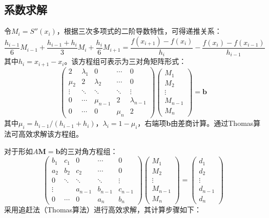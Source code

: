 \subsection{系数求解}
令$M_i = S''(x_i)$，根据三次多项式的二阶导数特性，可得递推关系：
\begin{equation}
    \frac{h_{i-1}}{6}M_{i-1} + \frac{h_{i-1}+h_i}{3}M_i + \frac{h_i}{6}M_{i+1} = \frac{f(x_{i+1})-f(x_i)}{h_i} - \frac{f(x_i)-f(x_{i-1})}{h_{i-1}}
\end{equation}
其中$h_i = x_{i+1}-x_i$。该方程组可表示为三对角矩阵形式：
\begin{equation}
    \begin{pmatrix}
        2 & \lambda_1 & 0 & \cdots & 0 \\
        \mu_2 & 2 & \lambda_2 & \cdots & 0 \\
        \vdots & \ddots & \ddots & \ddots & \vdots \\
        0 & \cdots & \mu_{n-1} & 2 & \lambda_{n-1} \\
        0 & \cdots & 0 & \mu_n & 2
    \end{pmatrix}
    \begin{pmatrix}
        M_1 \\ M_2 \\ \vdots \\ M_{n-1} \\ M_n
    \end{pmatrix}
    = \mathbf{b}
\end{equation}
其中$\mu_i = h_{i-1}/(h_{i-1}+h_i)$，$\lambda_i = 1-\mu_i$，右端项$\mathbf{b}$由差商计算。通过Thomas算法可高效求解该方程组。

对于形如$A\mathbf{M} = \mathbf{b}$的三对角方程组：
\[
\begin{pmatrix}
    b_1 & c_1 & 0 & \cdots & 0 \\
    a_2 & b_2 & c_2 & \cdots & 0 \\
    0 & \ddots & \ddots & \ddots & \vdots \\
    \vdots & & a_{n-1} & b_{n-1} & c_{n-1} \\
    0 & \cdots & 0 & a_n & b_n
\end{pmatrix}
\begin{pmatrix}
    M_1 \\ M_2 \\ \vdots \\ M_{n-1} \\ M_n
\end{pmatrix}
= 
\begin{pmatrix}
    d_1 \\ d_2 \\ \vdots \\ d_{n-1} \\ d_n
\end{pmatrix}
\]
采用追赶法（Thomas算法）进行高效求解，其计算步骤如下：

